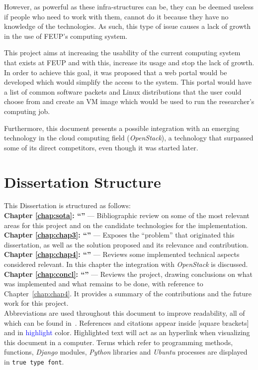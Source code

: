 However, as powerful as these infra-structures can be, they can be deemed useless if people who need to work with them, cannot do it because they have no knowledge of the technologies. As such, this type of issue causes a lack of growth in the use of FEUP's computing system.

This project aims at increasing the usability of the current computing system that exists at FEUP and with this, increase its usage and stop the lack of growth. In order to achieve this goal, it was proposed that a web portal would be developed which would simplify the access to the system. This portal would have a list of common software packets and Linux distributions that the user could choose from and create an VM image which would be used to run the researcher's computing job.

Furthermore, this document presents a possible integration with an emerging technology in the cloud computing field (\textit{OpenStack}), a technology that surpassed some of its direct competitors, even though it was started later.

\section{Dissertation Structure} \label{sec:structure}

This Dissertation is structured as follows:\\
\textbf{Chapter \ref{chap:sota}: ``'' } --- Bibliographic review on some of the most relevant areas for this project and on the candidate technologies for the implementation.\\
\textbf{Chapter \ref{chap:chap3}: ``'' } --- Exposes the ``problem'' that originated this dissertation, as well as the solution proposed and its relevance and contribution.\\
\textbf{Chapter \ref{chap:chap4}: ``'' } --- Reviews some implemented technical aspects considered relevant. In this chapter the integration with \textit{OpenStack} is discussed. \\
\textbf{Chapter \ref{chap:concl}: ``'' } --- Reviews the project, drawing conclusions on what was implemented and what remains to be done, with reference to Chapter~\ref{chap:chap4}. It provides a summary of the contributions and the future work for this project.\\

Abbreviations are used throughout this document to improve readability, all of which can be found in~. References and citations appear inside [square brackets] and in \textcolor{blue}{highlight} color. Highlighted text will act as an hyperlink when visualizing this document in a computer. Terms which refer to programming methods, functions, \textit{Django} modules, \textit{Python} libraries and \textit{Ubuntu} processes are displayed in \texttt{true type font}.
